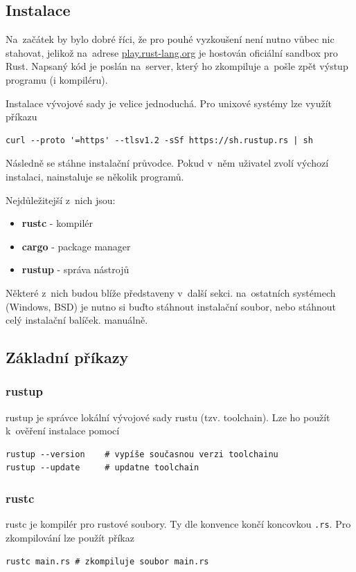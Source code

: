 \documentclass[a4paper, 12pt, twoside]{article} %
\begin{document}
	\subsection{Instalace}
		Na~začátek by bylo dobré říci, že pro pouhé vyzkoušení není nutno vůbec nic stahovat, jelikož na~adrese \href{https://play.rust-lang.org/}{play.rust-lang.org} je hostován oficiální sandbox pro Rust. Napsaný kód je poslán na~server, který ho zkompiluje a~pošle zpět výstup programu (i kompiléru).
	
		Instalace vývojové sady je velice jednoduchá. Pro unixové systémy lze využít příkazu
		\begin{verbatim}
curl --proto '=https' --tlsv1.2 -sSf https://sh.rustup.rs | sh
		\end{verbatim}
		Následně se stáhne instalační průvodce. Pokud v~něm uživatel zvolí výchozí instalaci, nainstaluje se několik programů.
		
		Nejdůležitejší z~nich jsou:
		\begin{itemize}
			\item \textbf{rustc} - kompilér
			\item \textbf{cargo} - package manager
			\item \textbf{rustup} - správa nástrojů
		\end{itemize}

		Některé z~nich budou blíže představeny v~další sekci.
		na~ostatních systémech (Windows, BSD) je nutno si buďto stáhnout instalační soubor, nebo stáhnout celý instalační balíček. manuálně\cite{rustdl}.

		\subsection{Základní příkazy}
			\subsubsection*{rustup}
				rustup je správce lokální vývojové sady rustu (tzv. toolchain). Lze ho použít k~ověření instalace pomocí
				\begin{verbatim}
rustup --version    # vypíše současnou verzi toolchainu
rustup --update     # updatne toolchain
				\end{verbatim}

			\subsubsection*{rustc}
				rustc je kompilér pro rustové soubory. Ty dle konvence končí koncovkou \texttt{.rs}. Pro zkompilování lze použít příkaz
				\begin{verbatim}
rustc main.rs # zkompiluje soubor main.rs
				\end{verbatim}
	
\end{document}
